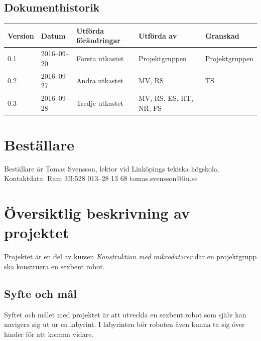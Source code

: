\documentclass[a4paper,titlepage,12pt]{article}
\begin{document}
\begin{center}

		\section*{Dokumenthistorik}
		\renewcommand*{\arraystretch}{1.4}
        \begin{longtable}[c]{ l l l >{\raggedright}p{3cm} l }
			\textbf{Version} & \textbf{Datum} & \textbf{Utförda förändringar} 
			& \textbf{Utförda av} & \textbf{Granskad} \\ \midrule

			0.1 & 2016--09--20 & Första utkastet & Projektgruppen & Projektgruppen\\
			0.2 & 2016--09--27 & Andra utkastet & MV, RS & TS \\
			0.3 & 2016--09--28 & Tredje utkastet & MV, RS, ES, HT, NR, FS & \\
		\end{longtable}
	\end{center}

	\newpage

	\section{Beställare}
	Beställare är Tomas Svensson, lektor vid Linköpings tekiska högskola. \\
  Kontaktdata: Rum 3B:528 013–28 13 68 tomas.svensson@liu.se


	\section{Översiktlig beskrivning av projektet}
	Projektet är en del av kursen \textit{Konstruktion med mikrodatorer} där en
  projektgrupp ska konstruera en sexbent robot. 

	\subsection{Syfte och mål}
	Syftet och målet med projektet är att utveckla en sexbent robot som själv
	kan navigera sig ut ur en labyrint. I labyrinten bör roboten även kunna ta
	sig över hinder för att komma vidare.
\end{document}
